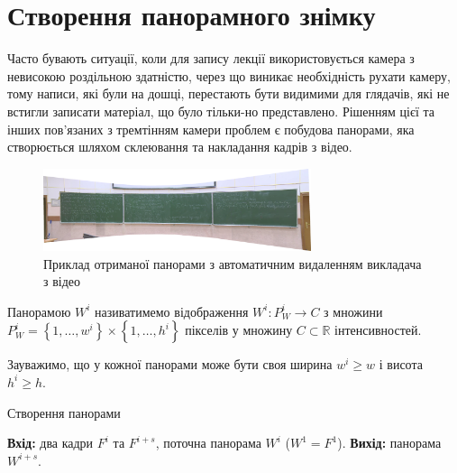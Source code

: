\section{Створення панорамного знімку}

Часто бувають ситуації, коли для запису лекції використовується камера з
невисокою роздільною здатністю, через що виникає необхідність рухати
камеру, тому написи, які були на дошці, перестають бути видимими для
глядачів, які не встигли записати матеріал, що було тільки-но
представлено. Рішенням цієї та інших пов'язаних з тремтінням
камери проблем є побудова панорами, яка створюється шляхом склеювання
та накладання кадрів з відео.

\begin{figure}[H]
    \centering
    \includegraphics[width=0.7\textwidth]{images/panorama_example}
    \caption{Приклад отриманої панорами з автоматичним видаленням
        викладача з відео \cite{fpmi_2021_video}
        \label{fig:panorama_example}
    }
\end{figure}

\begin{definition}
    Панорамою \(W^{i}\) називатимемо відображення
    \(W^{i}:P_{W}^{i} \rightarrow C\) з множини
    \(P_{W}^{i} = \left\{ 1,\ldots,w^{i} \right\} \times \left\{ 1,\ldots,h^{i} \right\}\)
    пікселів у множину \(C\mathbb{\subset R}\) інтенсивностей.
\end{definition}

Зауважимо, що
у кожної панорами може бути своя ширина \(w^{i} \geq w\) і висота
\(h^{i} \geq h\).

\begin{algorithm}[H]
    \caption{Створення панорами}
    \label{al:panorama_creating_algorithm}
    \begin{algorithmic}
        \State \textbf{Вхід:} два кадри \(F^{i}\) та \(F^{i + s}\), поточна панорама \(W^{i}\) (\(W^{1} = F^{1}\)).
        \State \textbf{Вихід:} панорама \(W^{i + s}\).
    \end{algorithmic}
\end{algorithm}

